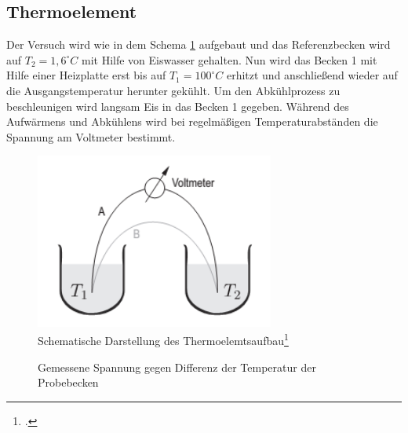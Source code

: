 \subsection{Thermoelement}
Der Versuch wird wie in dem Schema \ref{fig:Thermoaufbau} aufgebaut und das Referenzbecken wird auf $T_2=1,6^\circ C$ mit Hilfe von Eiswasser gehalten. Nun wird das Becken 1 mit Hilfe einer Heizplatte erst bis auf $T_1=100^\circ C$ erhitzt und anschließend wieder auf die Ausgangstemperatur herunter gekühlt. Um den Abkühlprozess zu beschleunigen wird langsam Eis in das Becken 1 gegeben. Während des Aufwärmens und Abkühlens wird bei regelmäßigen Temperaturabständen die Spannung am Voltmeter bestimmt.
\begin{figure}[htbp] 
  \centering
	\includegraphics[width=0.7\textwidth]{Thermoaufbau.png}
	\caption{Schematische Darstellung des Thermoelemtsaufbau\footcite{anleitung-ws2014}}
  \label{fig:Thermoaufbau}
\end{figure}
\begin{figure}[H]
  \centering
  \caption{Gemessene Spannung gegen Differenz der Temperatur der Probebecken}
  \label{fig:Thermo}
\end{figure}
